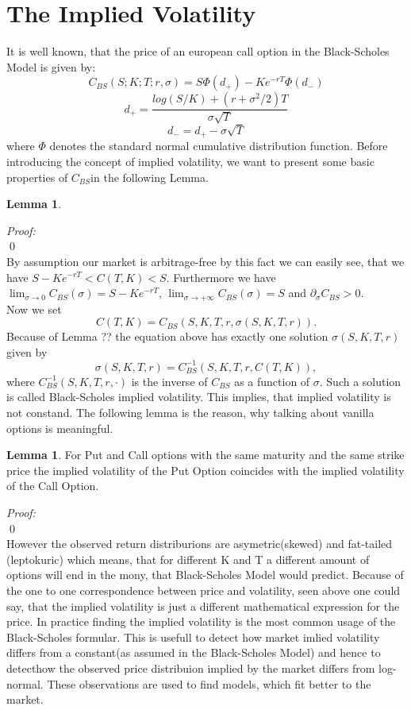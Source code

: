 \documentclass[12pt]{article}
\theoremstyle{definition}
\newtheorem{lemma}[defi]{Lemma}
\newcommand{\C}{C_{BS}}
\begin{document}
\tableofcontents 


\section{The Implied Volatility}

It is well known, that the price of an european call option in the Black-Scholes Model is given by:
$$C_{BS}(S;K;T;r,\sigma)=S\Phi(d_+)-Ke^{-rT}\Phi(d_-)$$
$$d_+=\frac{log(S/K)+(r+\sigma^2/2)T}{\sigma\sqrt{T}}$$
$$d_-=d_+-\sigma\sqrt{T}$$
where $\Phi$ denotes the standard normal cumulative distribution function.
Before introducing the concept of implied volatility, we want to present some basic properties of $C_{BS}$in the following Lemma.
\begin{lemma}
\end{lemma}
\emph{Proof:}\\
\qed\\
By assumption our market is arbitrage-free by this fact we can easily see, that we have $S-Ke^{-rT}<C(T,K)<S$.
Furthermore we have $\lim_{\sigma\rightarrow 0}C_{BS}(\sigma)=S-Ke^{-rT}$, $\lim_{\sigma\rightarrow +\infty}C_{BS}(\sigma)=S$ and
$\partial_\sigma C_{BS}>0$.\\
Now we set
$$C(T,K)=\C(S,K,T,r,\sigma(S,K,T,r)).$$
Because of Lemma ?? the equation above has exactly one solution $\sigma(S,K,T,r)$ given by
$$\sigma(S,K,T,r)=\C^{-1}(S,K,T,r,C(T,K)),$$
where $\C^{-1}(S,K,T,r,\cdot)$ is the inverse of $\C$ as a function of $\sigma$.
Such a solution is called Black-Scholes implied volatility. This implies, that implied volatility is not constand.
The following lemma is the reason, why talking about vanilla options is meaningful.
\begin{lemma}
For Put and Call options with the same maturity and the same strike price the implied volatility of the Put Option coincides with the implied volatility of the Call Option.
\end{lemma}
\emph{Proof:}\\
\qed\\
However the observed return distriburions are asymetric(skewed) and fat-tailed (leptokuric) which means, that for different K and T a different amount of options will end in the mony, that Black-Scholes Model would predict.
Because of the one to one correspondence between price and volatility, seen above one could say, that the implied volatility is just a different mathematical expression for the price.
In practice finding the implied volatility is the most common usage of the Black-Scholes formular. This is usefull to detect how market imlied volatility differs from a constant(as assumed in the Black-Scholes Model) and hence to detecthow the observed price distribuion implied by the market differs from log-normal. These observations are used to find models, which fit better to the market.
\end{document}

